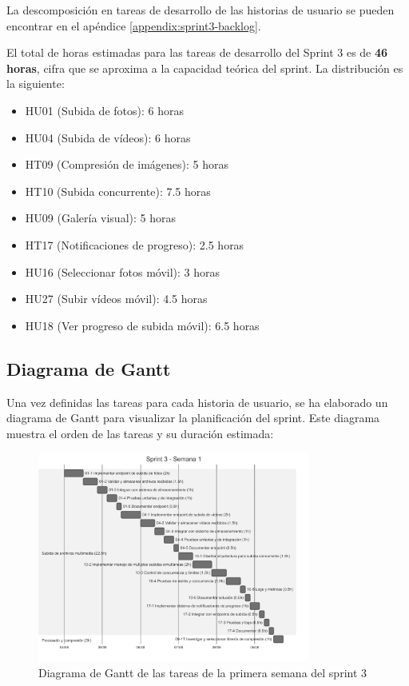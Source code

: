 La descomposición en tareas de desarrollo de las historias de usuario se pueden encontrar en el apéndice \ref{appendix:sprint3-backlog}.

El total de horas estimadas para las tareas de desarrollo del Sprint 3 es de \textbf{46 horas}, cifra que se aproxima a la capacidad teórica del sprint. La distribución es la siguiente:

\begin{itemize}
    \item HU01 (Subida de fotos): 6 horas
    \item HU04 (Subida de vídeos): 6 horas
    \item HT09 (Compresión de imágenes): 5 horas
    \item HT10 (Subida concurrente): 7.5 horas
    \item HU09 (Galería visual): 5 horas
    \item HT17 (Notificaciones de progreso): 2.5 horas
    \item HU16 (Seleccionar fotos móvil): 3 horas
    \item HU27 (Subir vídeos móvil): 4.5 horas
    \item HU18 (Ver progreso de subida móvil): 6.5 horas
\end{itemize}

\newpage
\subsection{Diagrama de Gantt}
Una vez definidas las tareas para cada historia de usuario, se ha elaborado un diagrama de Gantt para visualizar la planificación del sprint. Este diagrama muestra el orden de las tareas y su duración estimada:

\begin{figure}[H]
    \begin{center}
        \includegraphics[width=0.8\textwidth]{assets/sprint3/week1-gantt.png}
    \end{center}
    \caption{Diagrama de Gantt de las tareas de la primera semana del sprint 3}\label{fig:gantt-sprint3-week1}
\end{figure}


